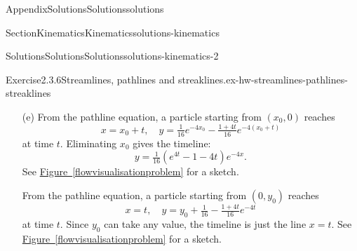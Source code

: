 \documentclass[oneside,10pt,]{book}
\newcommand{\xreffont}{\relax}
\numberwithin{equation}{section}
\begin{document}
\begin{appendixptx}{Appendix}{Solutions}{}{Solutions}{}{}{solutions}
\begin{sectionptx}{Section}{Kinematics}{}{Kinematics}{}{}{solutions-kinematics}
\begin{solutions-subsection-numberless}{Solutions}{Solutions}{}{Solutions}{}{}{solutions-kinematics-2}
\begin{divisionsolution}{Exercise}{2.3.6}{Streamlines, pathlines and streaklines.}{ex-hw-streamlines-pathlines-streaklines}
\begin{enumerate}[font=\bfseries,label=(\alph*),ref=\alph*]
\begin{equation*}
0 = x_0 + t_1, \quad
0 = y_0 + \tfrac{1}{16} e^{-4x_0}
- \tfrac{1+4t_1}{16} e^{-4(x_0+t_1)}.
\end{equation*}
Solving for \(x_0\) and \(y_0\):%
\begin{equation*}
x_0 = -t_1,\quad
y_0 = -\tfrac{1}{16}\left(e^{4t_1} - 1 - 4t_1\right).
\end{equation*}
At time \(t\) the particle is at:%
\begin{equation*}
x = t - t_1,\quad
y = \tfrac{1}{16}\left((1+4t_1) - (1+4t)e^{-4(t-t_1)}\right).
\end{equation*}
Eliminating \(t_1\) gives the streakline at time \(t\):%
\begin{equation*}
y = \tfrac{1}{16}\left((1+4t)(1-e^{-4x}) - 4x\right).
\end{equation*}
See \hyperref[flowvisualisationproblem]{Figure~{\xreffont\ref{flowvisualisationproblem}}} for a sketch. Note that the streamlines, pathlines and streaklines are all very different.%
\item[(e)]\noindent\hypertarget{ex-hw-streamlines-pathlines-streaklines-7-2-main}{}From the pathline equation, a particle starting from \((x_0,0)\) reaches%
\begin{equation*}
x = x_0 + t,\quad
y = \tfrac{1}{16} e^{-4x_0}
- \tfrac{1+4t}{16} e^{-4(x_0+t)}
\end{equation*}
at time \(t\). Eliminating \(x_0\) gives the timeline:%
\begin{equation*}
y = \tfrac{1}{16}\left(e^{4t} - 1 - 4t\right)e^{-4x}.
\end{equation*}
See \hyperref[flowvisualisationproblem]{Figure~{\xreffont\ref{flowvisualisationproblem}}} for a sketch.%
\par
From the pathline equation, a particle starting from \((0,y_0)\) reaches%
\begin{equation*}
x = t,\quad
y = y_0 + \tfrac{1}{16}
- \tfrac{1+4t}{16} e^{-4t}
\end{equation*}
at time \(t\). Since \(y_0\) can take any value, the timeline is just the line \(x
= t\). See \hyperref[flowvisualisationproblem]{Figure~{\xreffont\ref{flowvisualisationproblem}}} for a sketch.%
\end{enumerate}%
\end{divisionsolution}%
\end{solutions-subsection-numberless}
\end{sectionptx}
%
%
\typeout{************************************************}

\end{appendixptx}
\end{document}

